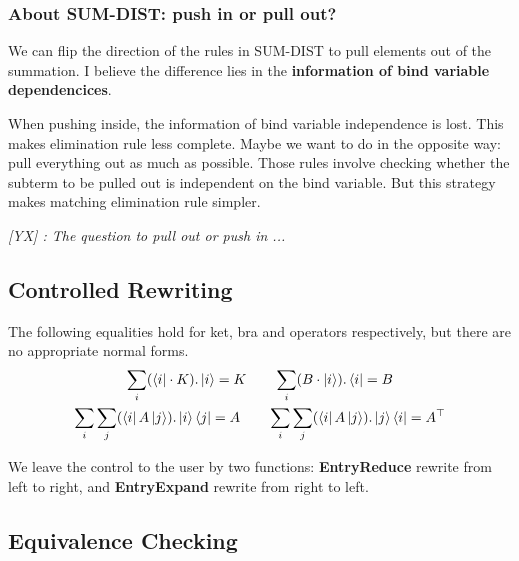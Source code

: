 \documentclass[manuscript, review, timestamp]{acmart}
\newcommand{\yx}[1]{\textit{\color{blue}[YX] : #1}}
\newcommand*{\reduce}{\ \triangleright\ }
\begin{document}
\subsubsection*{About \textsf{SUM-DIST}: push in or pull out?}
We can flip the direction of the rules in \textsf{SUM-DIST} to pull elements out of the summation. I believe the difference lies in the \textbf{information of bind variable dependencices}.

When pushing inside, the information of bind variable independence is lost. This makes elimination rule less complete. Maybe we want to do in the opposite way: pull everything out as much as possible. Those rules involve checking whether the subterm to be pulled out is independent on the bind variable. But this strategy makes matching elimination rule simpler.

\yx{The question to pull out or push in ...}


\subsection{Controlled Rewriting}

The following equalities hold for ket, bra and operators respectively, but there are no appropriate normal forms. 
\begin{gather*}
  \sum_i (\bra{i} \cdot K).\ket{i} = K
  \qquad
  \sum_i (B \cdot \ket{i}).\bra{i} = B \\
  \sum_i \sum_j (\bra{i} A \ket{j}).\ket{i}\bra{j} = A
  \qquad
  \sum_i \sum_j (\bra{i} A \ket{j}).\ket{j}\bra{i} = A^\top
\end{gather*}

We leave the control to the user by two functions: \textbf{EntryReduce} rewrite from left to right, and \textbf{EntryExpand} rewrite from right to left.

\subsection{Equivalence Checking}
\end{document}
